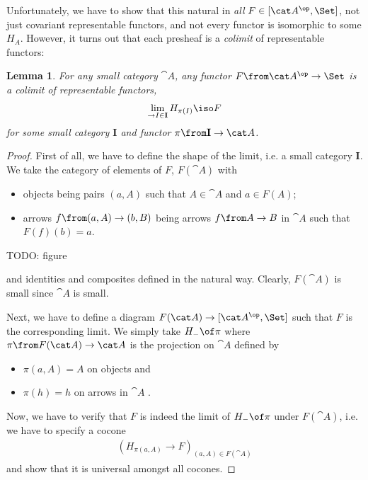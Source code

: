 \documentclass{article}
\newtheorem{lemma}{Lemma}
\begin{document}
Unfortunately, we have to show that this natural in \emph{all} $F\in[\cat A^\op,\Set]$, not just covariant representable functors, and not every functor is isomorphic to some $H_A$. However, it turns out that each presheaf is a \emph{colimit} of representable functors:

\begin{lemma}
  \label{lem:lim}
  For any small category $\cat A$, any functor $F\from\cat A^\op\to\Set$ is a colimit of representable functors,
  \begin{align*}
    \lim_{\to I\in\mathbf I} H_{\pi(I)}\iso F
  \end{align*}
  for some small category $\mathbf I$ and functor $\pi\from \mathbf I\to \cat A$.
\end{lemma}
\begin{proof}
  First of all, we have to define the shape of the limit, i.e. a small category $\mathbf I$. We take the category of elements of $F$, $F(\cat A)$ with
  \begin{itemize}
  \item objects being pairs $(a,A)$ such that $A\in\cat A$ and $a\in F(A)$;
  \item arrows $f\from(a,A)\to(b,B)$ being arrows $f\from A\to B$ in $\cat A$ such that $F(f)(b)=a$.
  \end{itemize}
  TODO: figure

  and identities and composites defined in the natural way. Clearly, $F(\cat A)$ is small since $\cat A$ is small.

  Next, we have to define a diagram $F(\cat A)\to[\cat A^\op,\Set]$ such that $F$ is the corresponding limit. We simply take $H_-\of\pi$ where $\pi\from F(\cat A)\to\cat A$ is the projection on $\cat A$ defined by 
  \begin{itemize}
  \item $\pi(a,A)=A$ on objects and
  \item $\pi(h)=h$ on arrows in $\cat A$ .
  \end{itemize}

  Now, we have to verify that $F$ is indeed the limit of $H_-\of\pi$ under $F(\cat A)$, i.e. we have to specify a cocone
  \begin{align*}
    (H_{\pi(a,A)}\to F)_{(a,A)\in F(\cat A)}
  \end{align*}
  and show that it is universal amongst all cocones.


\end{proof}
\end{document}
